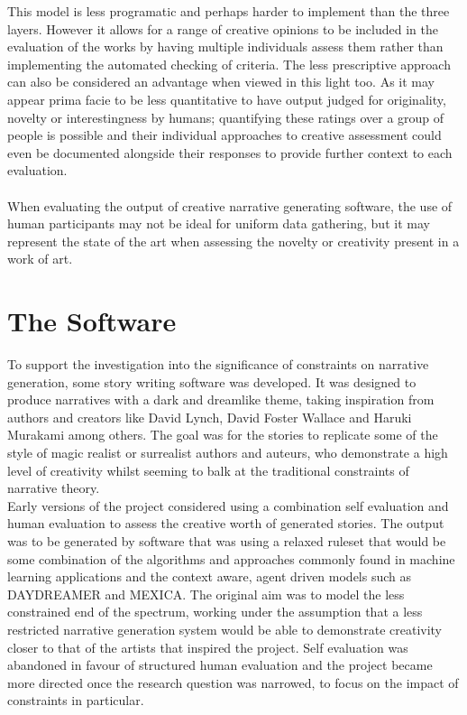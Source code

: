 \documentclass[letterpaper]{article}
\begin{document}
This model is less programatic and perhaps harder to implement than the three layers. However it allows for a range of creative opinions to be included in the evaluation of the works by having multiple individuals assess them rather than implementing the automated checking of criteria. The less prescriptive approach can also be considered an advantage when viewed in this light too. As it may appear prima facie to be less quantitative to have output judged for originality, novelty or interestingness by humans; quantifying these ratings over a group of people is possible and their individual approaches to creative assessment could even be documented alongside their responses to provide further context to each evaluation.\\
\\When evaluating the output of creative narrative generating software, the use of human participants may not be ideal for uniform data gathering,  but it may represent the state of the art when assessing the novelty or creativity present in a work of art.\\

\section{The Software}
To support the investigation into the significance of constraints on narrative generation, some story writing software was developed. 
It was designed to produce narratives with a dark and dreamlike theme, taking inspiration from authors and creators like David Lynch, David Foster Wallace and Haruki Murakami among others. The goal was for the stories to replicate some of the style of magic realist or surrealist authors and auteurs, who demonstrate a high level of creativity whilst seeming to balk at the traditional constraints of narrative theory. \\

Early versions of the project considered using a combination self evaluation and human evaluation to assess the creative worth of generated stories. The output was to be generated by software that was using a relaxed ruleset that would be some combination of the algorithms and approaches commonly found in machine learning applications and the context aware, agent driven models such as DAYDREAMER and MEXICA. The original aim was to model the less constrained end of the spectrum, working under the assumption that a less restricted narrative generation system would be able to demonstrate creativity closer to that of the artists that inspired the project. Self evaluation was abandoned in favour of structured human evaluation and the project became more directed once the research question was narrowed, to focus on the impact of constraints in particular.\\
\end{document}
